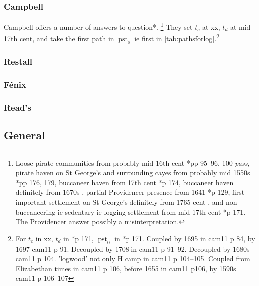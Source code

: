 \documentclass{amsart}
\newcommand{\foreign}[1]{\textit{#1}}%
\DeclareMathOperator{\pst}{pst}%
\theoremstyle{definition}
\theoremstyle{remark}
\begin{document}
		\subsubsection{Campbell}
		\label{sss:campbell}
		Campbell offers a number of answers to question*.
		\footnote{Loose pirate communities from probably mid 16th cent \cite{cam11}*{pp 95--96, 100 \foreign{pass}}, pirate haven on St George's and surrounding cayes from probably mid 1550s \cite{cam03}*{pp 176, 179}, buccaneer haven from 17th cent \cite{cam03}*{p 174}, buccaneer haven definitely from 1670s , partial Providencer presence from 1641 \cite{cam11}*{p 129}, first important settlement on St George's definitely from 1765 cent , and non-buccaneering ie sedentary ie logging settlement from mid 17th cent \cite{cam03}*{p 171}. The Providencer answer possibly a misinterpretation.} They set \(t_c\) at xx, \(t_d\) at mid 17th cent, and take the first path in \(\pst_0\) ie first in \ref{tab:pathsforlog}.\footnote{For \(t_c\) in xx, \(t_d\) in \cite{cam03}*{p 171}, \(\pst_0\) in \cite{cam03}*{p 171}. Coupled by 1695 in cam11 p 84, by 1697 cam11 p 91. Decoupled by 1708 in cam11 p 91--92. Decoupled by 1680s cam11 p 104. 'logwood' not only H camp in cam11 p 104--105. Coupled from Elizabethan times in cam11 p 106, before 1655 in cam11 p106, by 1590s cam11 p 106--107}
		\subsubsection{Restall}
		\label{sss:restall}
		\subsubsection{Fénix}
		\label{sss:fenix}
		\subsubsection{Read's}
		\label{sss:reads}		
	\subsection{General}
		\label{ss:general}
%
%
%
\begin{bibdiv}
	\label{s:references}
	\begin{biblist}
	\end{biblist}
\end{bibdiv}
%
%
%
\end{document}
